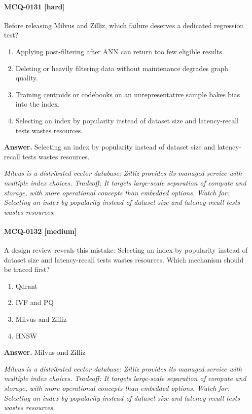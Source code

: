 \paragraph{MCQ-0131 [hard]} Before releasing Milvus and Zilliz, which failure deserves a dedicated regression test?
\begin{enumerate}[label=\Alph*.]
\item Applying post-filtering after ANN can return too few eligible results.
\item Deleting or heavily filtering data without maintenance degrades graph quality.
\item Training centroids or codebooks on an unrepresentative sample bakes bias into the index.
\item Selecting an index by popularity instead of dataset size and latency-recall tests wastes resources.
\end{enumerate}
\noindent\textbf{Answer.} Selecting an index by popularity instead of dataset size and latency-recall tests wastes resources.
\par\textit{Milvus is a distributed vector database; Zilliz provides its managed service with multiple index choices. Tradeoff: It targets large-scale separation of compute and storage, with more operational concepts than embedded options. Watch for: Selecting an index by popularity instead of dataset size and latency-recall tests wastes resources.}
\paragraph{MCQ-0132 [medium]} A design review reveals this mistake: Selecting an index by popularity instead of dataset size and latency-recall tests wastes resources. Which mechanism should be traced first?
\begin{enumerate}[label=\Alph*.]
\item Qdrant
\item IVF and PQ
\item Milvus and Zilliz
\item HNSW
\end{enumerate}
\noindent\textbf{Answer.} Milvus and Zilliz
\par\textit{Milvus is a distributed vector database; Zilliz provides its managed service with multiple index choices. Tradeoff: It targets large-scale separation of compute and storage, with more operational concepts than embedded options. Watch for: Selecting an index by popularity instead of dataset size and latency-recall tests wastes resources.}
